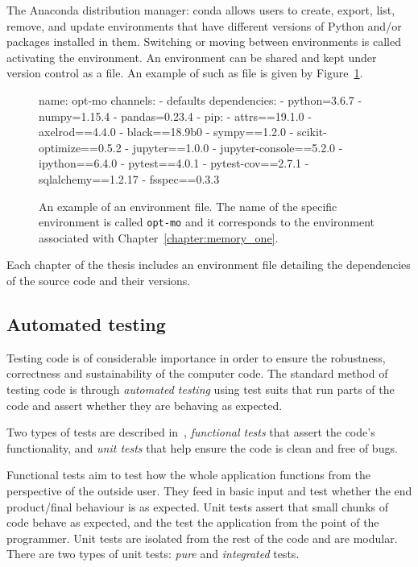 The Anaconda
distribution manager: conda allows users to create, export, list, remove, and update environments that
have different versions of Python and/or packages installed in them. Switching
or moving between environments is called activating the environment. An environment
can be shared and kept under version control as a file. An example of
such as file is given by Figure~\ref{fig:environment_file}.

\begin{figure}
\begin{shell}
name: opt-mo
channels:
  - defaults
dependencies:
  - python=3.6.7
  - numpy=1.15.4
  - pandas=0.23.4
  - pip:
    - attrs==19.1.0
    - axelrod==4.4.0
    - black==18.9b0
    - sympy==1.2.0
    - scikit-optimize==0.5.2
    - jupyter==1.0.0
    - jupyter-console==5.2.0
    - ipython==6.4.0
    - pytest==4.0.1
    - pytest-cov==2.7.1
    - sqlalchemy==1.2.17
    - fsspec==0.3.3
\end{shell}
\caption{An example of an environment file. The name of the specific environment is called
\texttt{opt-mo} and it corresponds to the environment associated with
Chapter~\ref{chapter:memory_one}.}\label{fig:environment_file}
\end{figure}

Each chapter of the thesis includes an environment file detailing the dependencies
of the source code and their versions.

\subsection{Automated testing}

Testing code is of considerable importance in order to ensure the robustness,
correctness and sustainability of the computer code. The standard method of testing code is through
\textit{automated testing} using test suits that run parts of the code and
assert whether they are behaving as expected.

Two types of tests are described in~\cite{Percival2014}, \textit{functional
tests} that assert the code's functionality, and \textit{unit tests} that help
ensure the code is clean and free of bugs.

Functional tests aim to test how the whole application functions from the
perspective of the outside user. They feed in basic input and test whether the
end product/final behaviour is as expected. Unit tests assert that small chunks
of code behave as expected, and the test the application from the point of the
programmer. Unit tests are isolated from the rest of the code and are modular.
There are two types of unit tests: \textit{pure} and \textit{integrated} tests.

